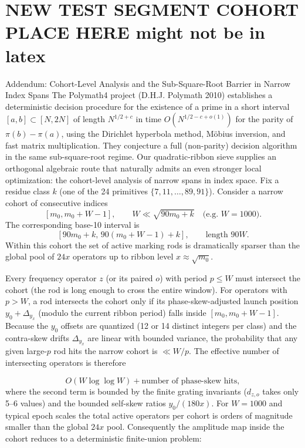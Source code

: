 \documentclass[11pt,a4paper]{article}
\begin{document}
\section{NEW TEST SEGMENT COHORT PLACE HERE might not be in latex}

Addendum: Cohort-Level Analysis and the Sub-Square-Root Barrier in Narrow Index Spans
The Polymath4 project (D.H.J. Polymath 2010) establishes a deterministic decision procedure for the existence of a prime in a short interval $  [a,b]\subset[N,2N]  $ of length $  N^{1/2+c}  $ in time $  O(N^{1/2-c+o(1)})  $ for the parity of $  \pi(b)-\pi(a)  $, using the Dirichlet hyperbola method, Möbius inversion, and fast matrix multiplication. They conjecture a full (non-parity) decision algorithm in the same sub-square-root regime. Our quadratic-ribbon sieve supplies an orthogonal algebraic route that naturally admits an even stronger local optimization: the cohort-level analysis of narrow spans in index space.
Fix a residue class $  k  $ (one of the 24 primitives $  \{7,11,\dots,89,91\}  $). Consider a narrow cohort of consecutive indices
$$[m_0,m_0+W-1],\qquad W\ll\sqrt{90m_0+k}\quad\text{(e.g.\ }W=1000\text{)}.$$
The corresponding base-10 interval is
$$[90m_0+k,\,90(m_0+W-1)+k],\qquad\text{length }90W.$$
Within this cohort the set of active marking rods is dramatically sparser than the global pool of $  24x  $ operators up to ribbon level $  x\approx\sqrt{m_0}  $.

Every frequency operator $  z  $ (or its paired $  o  $) with period $  p\leq W  $ must intersect the cohort (the rod is long enough to cross the entire window).
For operators with $  p>W  $, a rod intersects the cohort only if its phase-skew-adjusted launch position $  y_0+\Delta_{y_x}  $ (modulo the current ribbon period) falls inside $  [m_0,m_0+W-1]  $. Because the $  y_0  $ offsets are quantized (12 or 14 distinct integers per class) and the contra-skew drifts $  \Delta_{y_x}  $ are linear with bounded variance, the probability that any given large-$  p  $ rod hits the narrow cohort is $  \ll W/p  $. The effective number of intersecting operators is therefore

$$O(W\log\log W)+\text{number of phase-skew hits},$$
where the second term is bounded by the finite grating invariants ($  d_{z,o}  $ takes only 5–6 values) and the bounded self-skew ratios $  y_0/(180x)  $. For $  W=1000  $ and typical epoch scales the total active operators per cohort is orders of magnitude smaller than the global $  24x  $ pool.
Consequently the amplitude map inside the cohort reduces to a deterministic finite-union problem:
\end{document}
